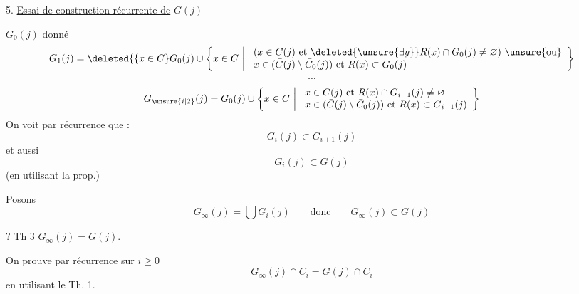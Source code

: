 
5. \uline{Essai de construction récurrente de} $G(j)$

$G_0(j)$ donné
\[
G_1(j)=\deleted{\{x\in C}G_0(j)\cup
\left\{x\in C\ \middle|\ 
\begin{array}{l}
(x\in C(j)\text{ et }\deleted{\unsure{\exists y}}R(x)\cap G_0(j)\ne\varnothing)\ \unsure{\text{ou}}\\
x\in(\bar C(j)\setminus\bar C_0(j))\text{ et }R(x)\subset G_0(j)
\end{array}\right\}
\]
\[
\cdots
\]
\[
G_{\unsure{i|2}}(j)=G_0(j)\cup
\left\{x\in C\ \middle|\ 
\begin{array}{l}
x\in C(j)\text{ et }R(x)\cap G_{i-1}(j)\ne\varnothing\\
x\in(\bar C(j)\setminus\bar C_0(j))\text{ et }R(x)\subset G_{i-1}(j)
\end{array}\right\}
\]
On voit par récurrence que :
\[
G_i(j)\subset G_{i+1}(j)
\]
et aussi
\[
G_i(j)\subset G(j)
\]
(en utilisant la prop.)

Posons
\[
G_\infty(j)=\bigcup G_i(j)\qquad\text{donc}\qquad G_\infty(j)\subset G(j)
\]

? \uline{Th 3} $G_\infty(j)=G(j)$.



On prouve par récurrence sur $i\geq0$
\[
G_\infty(j)\cap C_i=G(j)\cap C_i
\]
en utilisant le Th. 1.
